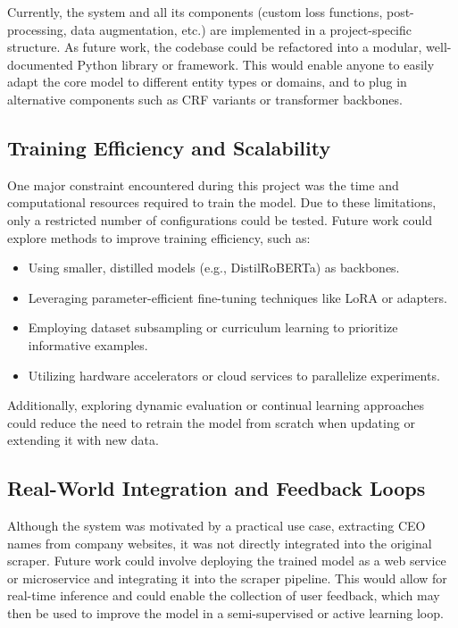 \documentclass[a4paper]{usiinfbachelorproject}
\begin{document}
Currently, the system and all its components (custom loss functions, post-processing, data augmentation, etc.) are implemented in a project-specific structure. As future work, the codebase could be refactored into a modular, well-documented Python library or framework. This would enable anyone to easily adapt the core model to different entity types or domains, and to plug in alternative components such as CRF variants or transformer backbones.

\subsection{Training Efficiency and Scalability}

One major constraint encountered during this project was the time and computational resources required to train the model. Due to these limitations, only a restricted number of configurations could be tested. Future work could explore methods to improve training efficiency, such as:

\begin{itemize}
    \item Using smaller, distilled models (e.g., DistilRoBERTa) as backbones.
    \item Leveraging parameter-efficient fine-tuning techniques like LoRA or adapters.
    \item Employing dataset subsampling or curriculum learning to prioritize informative examples.
    \item Utilizing hardware accelerators or cloud services to parallelize experiments.
\end{itemize}

Additionally, exploring dynamic evaluation or continual learning approaches could reduce the need to retrain the model from scratch when updating or extending it with new data.

\subsection{Real-World Integration and Feedback Loops}

Although the system was motivated by a practical use case, extracting CEO names from company websites, it was not directly integrated into the original scraper. Future work could involve deploying the trained model as a web service or microservice and integrating it into the scraper pipeline. This would allow for real-time inference and could enable the collection of user feedback, which may then be used to improve the model in a semi-supervised or active learning loop.
\end{document}
